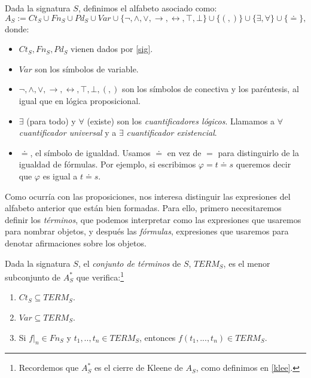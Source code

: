 \begin{definition}
Dada la signatura $S$, definimos el alfabeto asociado como:
$$A_{S} := Ct_S \cup Fn_S \cup Pd_S \cup Var \cup \{\neg, \land, \lor, \rightarrow, \leftrightarrow, \top, \bot \} \cup \{(, )\} \cup \{\exists, \forall\} \cup \{ \doteq \},$$
donde:
\begin{itemize}
    \item $Ct_S,Fn_S,Pd_S$ vienen dados por \ref{sig}.
    \item $Var$ son los símbolos de variable.
    \item $\neg, \land, \lor, \rightarrow, \leftrightarrow, \top, \bot,(,)$ son los símbolos de conectiva y los paréntesis, al igual que en lógica proposicional.
    \item $\exists$ (para todo) y $\forall$ (existe) son los \textit{cuantificadores lógicos}. Llamamos a $\forall$ \textit{cuantificador universal} y a $\exists$ \textit{cuantificador existencial}.
    \item $\doteq$, el símbolo de igualdad. Usamos $\doteq$ en vez de $=$ para distinguirlo de la igualdad de fórmulas. Por ejemplo, si escribimos $\varphi = t \doteq s$ queremos decir que $\varphi$ es igual a $t \doteq s$.
\end{itemize}

\end{definition}

Como ocurría con las proposiciones, nos interesa distinguir las expresiones del alfabeto anterior que están bien formadas. Para ello, primero necesitaremos definir los \textit{términos}, que podemos interpretar como las expresiones que usaremos para nombrar objetos, y después las \textit{fórmulas}, expresiones que usaremos para denotar afirmaciones sobre los objetos.

\begin{definition}\label{term}
Dada la signatura $S$, el \textit{conjunto de términos} de $S$, $TERM_S$, es el menor subconjunto de $A_{S}^*$ que verifica:\footnote{Recordemos que $A_{S}^*$ es el cierre de Kleene de $A_{S}$, como definimos en \ref{klee}.}
\begin{enumerate}
    \item $Ct_S\subseteq TERM_S$.
    \item $Var\subseteq TERM_S$.
    \item Si $f|_{n} \in Fn_S$ y $t_1, .., t_n \in TERM_S$, entonces $f(t_1, ..., t_n) \in TERM_S$. 
\end{enumerate}
\end{definition}

